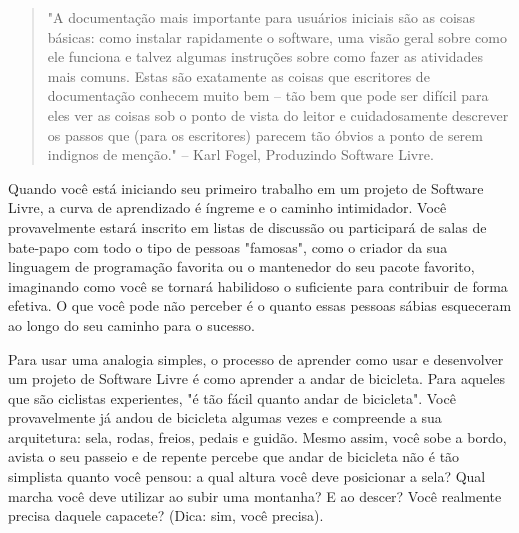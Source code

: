

\begin{quote}
"A documentação mais importante para usuários iniciais são as coisas básicas: como
instalar rapidamente o software, uma visão geral sobre como ele funciona e talvez
algumas instruções sobre como fazer as atividades mais comuns. Estas são exatamente
as coisas que escritores de documentação conhecem muito bem -- tão bem que pode ser
difícil para eles ver as coisas sob o ponto de vista do leitor e cuidadosamente descrever
os passos que (para os escritores) parecem tão óbvios a ponto de serem indignos de menção."
-- Karl Fogel, Produzindo Software Livre.
\end{quote}

Quando você está iniciando seu primeiro trabalho em um projeto de Software Livre,
a curva de aprendizado é íngreme e o caminho intimidador. Você provavelmente estará inscrito
em listas de discussão ou participará de salas de bate-papo com todo o tipo de pessoas "famosas",
como o criador da sua linguagem de programação favorita ou o mantenedor do seu pacote favorito,
imaginando como você se tornará habilidoso o suficiente para contribuir de forma efetiva. O que
você pode não perceber é o quanto essas pessoas sábias esqueceram ao longo do seu caminho para o
sucesso.

Para usar uma analogia simples, o processo de aprender como usar e desenvolver um
projeto de Software Livre é como aprender a andar de bicicleta. Para aqueles que são
ciclistas experientes, "é tão fácil quanto andar de bicicleta". Você provavelmente já
andou de bicicleta algumas vezes e compreende a sua arquitetura: sela, rodas,
freios, pedais e guidão. Mesmo assim, você sobe a bordo, avista o seu passeio e de repente
percebe que andar de bicicleta não é tão simplista quanto você pensou: a qual altura
você deve posicionar a sela? Qual marcha você deve utilizar ao subir uma montanha?
E ao descer? Você realmente precisa daquele capacete? (Dica: sim, você precisa).

